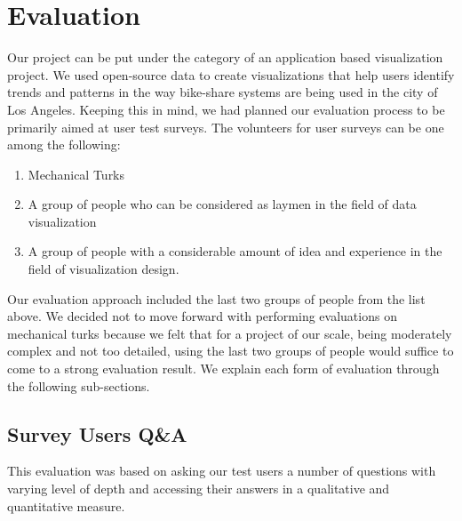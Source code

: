 \section{Evaluation} 
\label{sec:evaluation}

Our project can be put under the category of an application based visualization project. We used open-source data to create visualizations that help users identify trends and patterns in the way bike-share systems are being used in the city of Los Angeles. Keeping this in mind, we had planned our evaluation process to be primarily aimed at user test surveys.
The volunteers for user surveys can be one among the following:
\begin{enumerate}
	\item Mechanical Turks
	\item A group of people who can be considered as laymen in the field of data visualization
	\item A group of people with a considerable amount of idea and experience in the field of visualization design.
\end{enumerate}

Our evaluation approach included the last two groups of people from the list above. We decided not to move forward with performing evaluations on mechanical turks because we felt that for a project of our scale, being moderately complex and not too detailed, using the last two groups of people would suffice to come to a strong evaluation result. We explain each form of evaluation through the following sub-sections.

\subsection{Survey Users Q\&A}

This evaluation was based on asking our test users a number of questions with varying level of depth and accessing their answers in a qualitative and quantitative measure.

